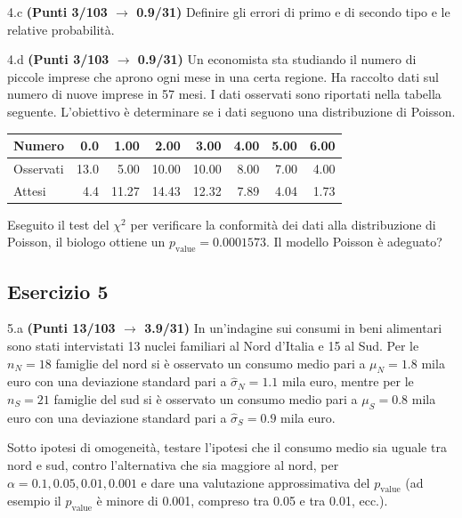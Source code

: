 \documentclass[
  11pt,
]{book}
\theoremstyle{mytheoremstyle}
\theoremstyle{mydefstyle}
\begin{document}
4.c \textbf{(Punti 3/103 \(\rightarrow\) 0.9/31)} Definire gli errori di primo e di secondo tipo e le relative probabilità.

4.d \textbf{(Punti 3/103 \(\rightarrow\) 0.9/31)} Un economista sta studiando il numero di piccole imprese che aprono ogni mese in una certa regione. Ha raccolto dati sul numero di nuove imprese in 57 mesi. I dati osservati sono riportati nella tabella seguente. L'obiettivo è determinare se i dati seguono una distribuzione di Poisson.

\begin{table}[H]
\centering
\begin{tabular}{l|r|r|r|r|r|r|r}
\hline
Numero & 0.0 & 1.00 & 2.00 & 3.00 & 4.00 & 5.00 & 6.00\\
\hline
Osservati & 13.0 & 5.00 & 10.00 & 10.00 & 8.00 & 7.00 & 4.00\\
\hline
Attesi & 4.4 & 11.27 & 14.43 & 12.32 & 7.89 & 4.04 & 1.73\\
\hline
\end{tabular}
\end{table}

Eseguito il test del \(\chi^2\) per verificare la conformità dei dati alla distribuzione di Poisson, il biologo ottiene un \(p_\text{value}=0.0001573\). Il modello Poisson è adeguato?

\subsection{Esercizio 5}\label{esercizio-5-37}

5.a \textbf{(Punti 13/103 \(\rightarrow\) 3.9/31)} In un'indagine sui consumi in beni alimentari sono stati intervistati 13 nuclei familiari al Nord d'Italia e 15 al Sud.
Per le \(n_N=18\) famiglie del nord si è osservato un consumo medio pari a \(\mu_N=1.8\) mila euro con una deviazione standard pari a \(\hat\sigma_N=1.1\) mila euro, mentre per le \(n_S=21\) famiglie del sud si è osservato un consumo medio pari a \(\mu_S=0.8\) mila euro con una deviazione standard pari a \(\hat\sigma_S=0.9\) mila euro.

Sotto ipotesi di omogeneità, testare l'ipotesi che il consumo medio sia uguale tra nord e sud, contro l'alternativa che sia maggiore al nord,
per \(\alpha=0.1,0.05,0.01,0.001\) e dare una valutazione approssimativa del \(p_\text{value}\) (ad esempio il \(p_\text{value}\) è minore di 0.001, compreso tra 0.05 e tra 0.01, ecc.).
\end{document}
